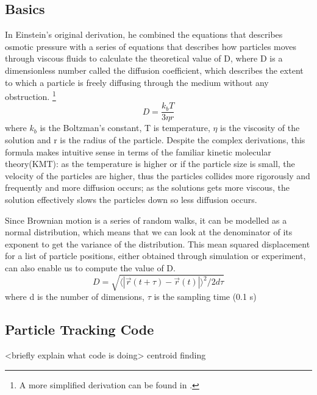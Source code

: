 \documentclass[iop,revtex4]{emulateapj_mod}
\begin{document}
\subsection{Basics}
\par In Einstein's original derivation, he combined the equations that describes osmotic pressure with a series of equations that describes how particles moves through viscous fluids to calculate the theoretical value of D, where D is a dimensionless number called the diffusion coefficient, which describes the extent to which a particle is freely diffusing through the medium without any obstruction. \citep{einstein_1905}\footnote{A more simplified derivation can be found in  \cite{newburgh}.}  
\begin{equation}
D = \frac{k_bT}{3\eta r}
\label{theory}
\end{equation}
where $k_b$ is the Boltzman's constant, T is temperature, $\eta$ is the viscosity of the solution and r is the radius of the particle. Despite the complex derivations, this formula  makes intuitive sense in terms of the familiar kinetic molecular theory(KMT): as the temperature is higher or if the particle size is small, the velocity of the particles are higher, thus the particles collides more rigorously and frequently and more diffusion occurs;  as the solutions gets more viscous, the solution effectively slows the particles down so less diffusion occurs.

\par Since Brownian motion is a series of random walks, it can be modelled as a normal distribution, which means that we can look at the denominator of its exponent to get the variance of the distribution.\citep{math} This mean squared displacement for a list of particle positions, either obtained through simulation or experiment, can also enable us to compute the value of D.
\begin{equation}
D = \sqrt{\langle |\vec{r}(t+\tau)-\vec{r}(t) |\rangle ^2 /2d\tau}
\label{exp}
\end{equation}
where d is the number of dimensions, $\tau$ is the sampling time (0.1 s)
\subsection{Particle Tracking Code}
<briefly explain what code is doing> 
centroid finding 
\end{document}
